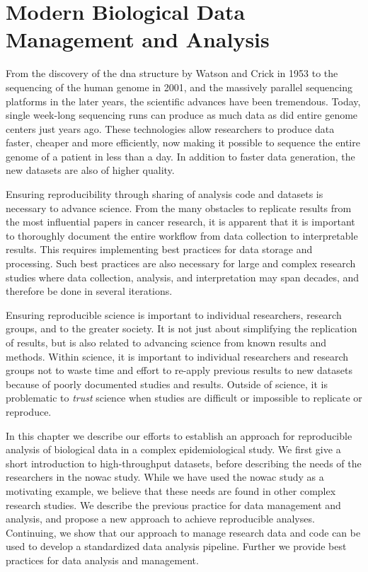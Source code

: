 \chapter{Modern Biological Data Management and Analysis}\label{biodata}
From the discovery of the \gls{dna} structure by Watson and Crick in
1953\cite{watson1953molecular} to the sequencing of the human genome in
2001,\cite{venter2001sequence,international2001initial} and the massively
parallel sequencing platforms in the later years\cite{metzker2010sequencing},
the scientific advances have been tremendous. Today, single week-long sequencing
runs can produce as much data as did entire genome centers just years
ago.\cite{kahn2011future}  These technologies allow researchers to produce data
faster, cheaper and more efficiently, now making it possible to sequence the
entire genome of a patient in less than a day. In addition to faster
data generation, the new datasets are also of higher quality.

Ensuring reproducibility through sharing of analysis code and datasets is
necessary to advance science.\cite{baker2016scientists} From the many obstacles
to replicate results from the most influential papers in cancer
research\cite{reprod}, it is apparent that it is important to thoroughly
document the entire workflow from data collection to interpretable results.
This requires implementing best practices for data storage and processing. Such
best practices are also necessary for large and complex research studies where
data collection, analysis, and interpretation may span decades, and therefore be
done in several iterations. 

Ensuring reproducible science is important to individual researchers, 
research groups, and to the greater society. It is not
just about simplifying the replication of results, but is also related to
advancing science from known results and methods. Within science, it is
important to individual researchers and research groups not to waste time and
effort to re-apply previous results to new datasets because of poorly documented
studies and results. Outside of science, it is problematic to \emph{trust}
science when studies are difficult or impossible to replicate or reproduce. 

In this chapter we describe our efforts to establish an approach for
reproducible analysis of biological data in a complex epidemiological study. We
first give a short introduction to high-throughput datasets, before describing
the needs of the researchers in the \gls{nowac} study. While we have used the
\gls{nowac} study as a motivating example, we believe that these needs are found
in other complex research studies.  We describe the previous practice for data
management and analysis, and propose a new approach to achieve reproducible
analyses. Continuing, we show that our approach to manage research data and code
can be used to develop a standardized data analysis pipeline. Further we provide
best practices for data analysis and management. 

